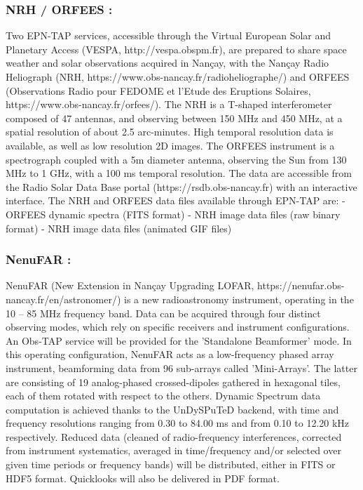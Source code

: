 \documentclass[11pt,a4paper]{ivoa}
\begin{document}
\subsubsection{NRH / ORFEES :}

Two EPN-TAP services, accessible through the Virtual European Solar and Planetary Access (VESPA, http://vespa.obspm.fr), are prepared to share space weather and solar observations acquired in Nançay, with the Nançay Radio Heliograph (NRH, https://www.obs-nancay.fr/radioheliographe/) and ORFEES (Observations Radio pour FEDOME et l'Etude des Eruptions Solaires, https://www.obs-nancay.fr/orfees/). The NRH is a T-shaped interferometer composed of 47 antennas, and observing between 150 MHz and 450 MHz, at a spatial resolution of about 2.5 arc-minutes. High temporal resolution data is available, as well as low resolution 2D images. The ORFEES instrument is a spectrograph coupled with a 5m diameter antenna, observing the Sun from 130 MHz to 1 GHz, with a 100 ms temporal resolution. The data are accessible from the Radio Solar Data Base portal (https://rsdb.obs-nancay.fr) with an interactive interface. The NRH and ORFEES data files available through EPN-TAP are:
- ORFEES dynamic spectra (FITS format)
- NRH image data files (raw binary format)
- NRH image data files (animated GIF files)


\subsubsection{NenuFAR :}

NenuFAR (New Extension in Nançay Upgrading LOFAR, https://nenufar.obs-nancay.fr/en/astronomer/) is a new radioastronomy instrument, operating in the 10 – 85 MHz frequency band. Data can be acquired through four distinct observing modes, which rely on specific receivers and instrument configurations. An Obs-TAP service will be provided for the 'Standalone Beamformer' mode. In this operating configuration, NenuFAR acts as a low-frequency phased array instrument, beamforming data from 96 sub-arrays called 'Mini-Arrays'. The latter are consisting of 19 analog-phased crossed-dipoles gathered in hexagonal tiles, each of them rotated with respect to the others. Dynamic Spectrum data computation is achieved thanks to the UnDySPuTeD backend, with time and frequency resolutions ranging from 0.30 to 84.00 ms and from 0.10 to 12.20 kHz respectively. Reduced data (cleaned of radio-frequency interferences, corrected from instrument systematics, averaged in time/frequency and/or selected over given time periods or frequency bands) will be distributed, either in FITS or HDF5 format. Quicklooks will also be delivered in PDF format.
\end{document}
